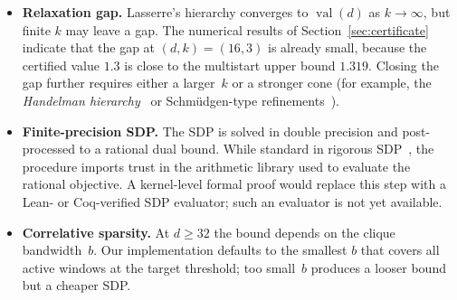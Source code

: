 \documentclass[11pt, letterpaper]{article}
\theoremstyle{paperplain}
\theoremstyle{paperdef}
\newcommand{\val}{\operatorname{val}}
\begin{document}
\begin{itemize}
  \item \textbf{Relaxation gap.}
    Lasserre's hierarchy converges to $\val(d)$ as $k\to\infty$, but
    finite $k$ may leave a gap.  The numerical results of
    Section~\ref{sec:certificate} indicate that the gap at $(d,k)=(16,3)$
    is already small, because the certified value $1.3$ is close to
    the multistart upper bound $1.319$.  Closing the gap further
    requires either a larger~$k$ or a stronger cone (for example, the
    \emph{Handelman hierarchy}~\cite{Handelman1988} or
    Schm\"udgen-type refinements~\cite{Schmudgen1991}).
  \item \textbf{Finite-precision SDP.}
    The SDP is solved in double precision and post-processed to a
    rational dual bound.  While standard in rigorous
    SDP~\cite{JanssonChaykinKeil2008}, the procedure imports trust in
    the arithmetic library used to evaluate the rational objective.
    A kernel-level formal proof would replace this step with a Lean-
    or Coq-verified SDP evaluator; such an evaluator is not yet
    available.
  \item \textbf{Correlative sparsity.}
    At $d\ge 32$ the bound depends on the clique bandwidth~$b$.  Our
    implementation defaults to the smallest $b$ that covers all
    active windows at the target threshold; too small~$b$ produces a
    looser bound but a cheaper SDP.
\end{itemize}





\end{document}
